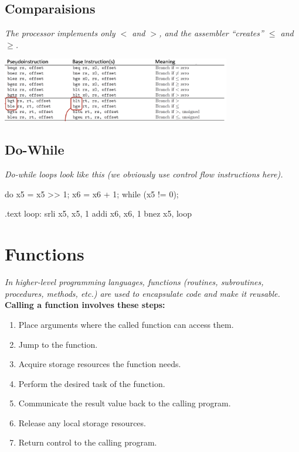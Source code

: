 \subsection{Comparaisions}
\textit{The processor implements only $<$ and $>$, and the assembler “creates” $\leq$ and $\geq$.}

\begin{center}
    \includegraphics[width=0.75\textwidth]{chapters/chapter1b/images/comp.png}
\end{center}
\subsection{Do-While}
\textit{Do-while loops look like this (we obviously use control flow instructions here).} \\
\begin{minipage}[htp]{0.4\textwidth}
\begin{cc}
do {
    x5 = x5 >> 1;
    x6 = x6 + 1;
} while (x5 != 0);
\end{cc}    
\end{minipage}
\hfill
\vline
\hfill
\begin{minipage}[htp]{0.4\textwidth}
\begin{assembly}
.text
loop:
    srli x5, x5, 1
    addi x6, x6, 1
    bnez x5, loop
\end{assembly}
\end{minipage}

\section{Functions}
\textit{In higher-level programming languages, functions (routines, subroutines, procedures, methods, etc.) are used to encapsulate code and make it reusable. } \\
\textbf{Calling a function involves these steps:}
\begin{enumerate}
    \item Place arguments where the called function can access them.
    \item Jump to the function.
    \item Acquire storage resources the function needs.
    \item Perform the desired task of the function.
    \item Communicate the result value back to the calling program.
    \item Release any local storage resources.
    \item Return control to the calling program.
\end{enumerate}
